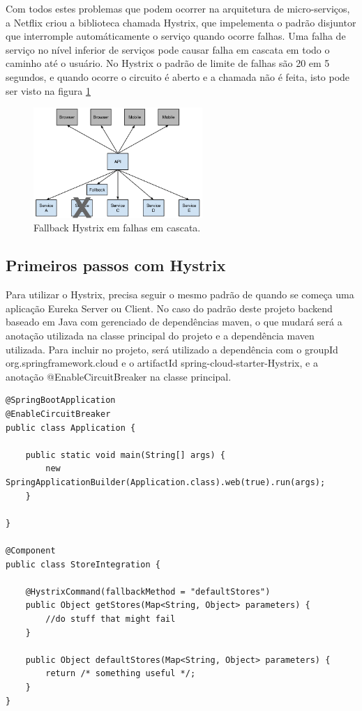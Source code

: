 Com todos estes problemas que podem ocorrer na arquitetura de micro-serviços, a Netflix criou a biblioteca chamada Hystrix, que impelementa o padrão disjuntor que interromple automáticamente o serviço quando ocorre falhas. Uma falha de serviço no nível inferior de serviços pode causar falha em cascata em todo o caminho até o usuário. No Hystrix o padrão de limite de falhas são 20 em 5 segundos, e quando ocorre o circuito é aberto e a chamada não é feita, isto pode ser visto na figura \ref{fig:figura7}

\begin{figure}[h]
\centering
\includegraphics[height=4.2cm]{imagens/figura7}
\caption{Fallback Hystrix em falhas em cascata.}
\label{fig:figura7}
\end{figure}

\subsection{Primeiros passos com Hystrix}

Para utilizar o Hystrix, precisa seguir o mesmo padrão de quando se começa uma aplicação Eureka Server ou Client. No caso do padrão deste projeto backend baseado em Java com gerenciado de dependências maven, o que mudará será a anotação utilizada na classe principal do projeto e a dependência maven utilizada. Para incluir no projeto, será utilizado a dependência com o groupId org.springframework.cloud e o artifactId spring-cloud-starter-Hystrix, e a anotação @EnableCircuitBreaker na classe principal.

\begin{verbatim}
@SpringBootApplication
@EnableCircuitBreaker
public class Application {

    public static void main(String[] args) {
        new SpringApplicationBuilder(Application.class).web(true).run(args);
    }

}

@Component
public class StoreIntegration {

    @HystrixCommand(fallbackMethod = "defaultStores")
    public Object getStores(Map<String, Object> parameters) {
        //do stuff that might fail
    }

    public Object defaultStores(Map<String, Object> parameters) {
        return /* something useful */;
    }
}
\end{verbatim}

